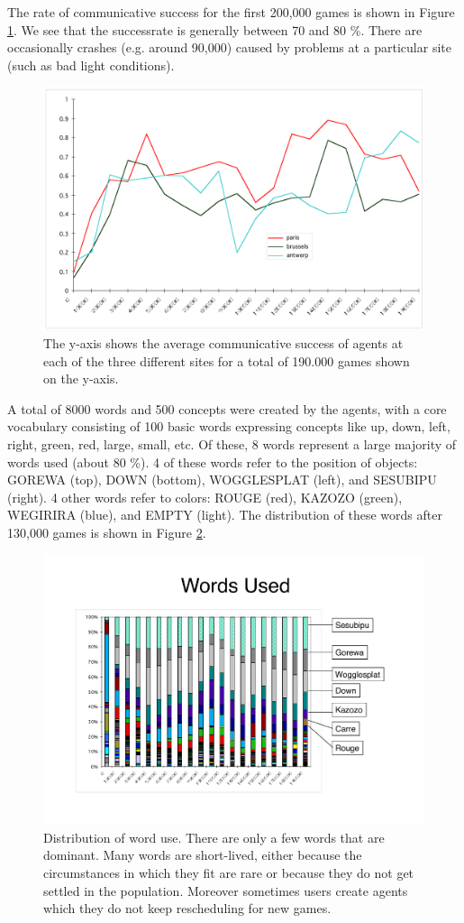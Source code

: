 {The rate of communicative success for the first 200,000 games is shown in Figure \ref{fig:allsites}. We see that the successrate is generally between 70 and 80 \%. There are occasionally crashes (e.g. around 90,000) caused by problems at a particular site (such as bad light conditions). 

\begin{figure}[htbp]
  \centerline{\includegraphics[width=.80\textwidth]{chap8/figures/allsites}}
\caption{\footnotesize\label{fig:allsites} 
The y-axis shows the average communicative success of agents at each of the three different sites for a total 
of 190.000 games shown on the y-axis. 
}
\end{figure}

A total of 8000 words and 500 concepts were created by the agents, with a core vocabulary consisting of 100 basic words expressing concepts like up, down, left, right, green, red, large, small, etc. Of these, 8 words represent a large majority of words used (about 80 \%). 4 of these words refer to the position of objects: GOREWA (top), DOWN (bottom), WOGGLESPLAT (left), and SESUBIPU (right). 4 other words refer to colors: ROUGE (red), KAZOZO (green), WEGIRIRA (blue), and EMPTY (light). The distribution of these words after 130,000 games is shown in Figure \ref{fig:words-used}. 

\begin{figure}[htbp]
 \centerline{\includegraphics[width=.80\textwidth]{chap8/figures/words-used}}
\caption{\footnotesize\label{fig:words-used} 
Distribution of word use. There are only a few words that are dominant. Many words are 
short-lived, either because the circumstances 
in which they fit are rare or because they do not get settled in the population. Moreover sometimes users create agents 
which they do not keep rescheduling for new games. 
}
\end{figure}

}
